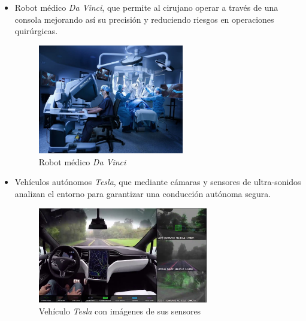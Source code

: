 \begin{itemize}
    \item Robot médico \textit{Da Vinci}, que permite al cirujano operar a través de una consola mejorando así su precisión y reduciendo riesgos en operaciones quirúrgicas.
      \begin{figure}[H]
    \centering
    \includegraphics[width=0.6\textwidth]{img/davinci.jpg}
    \caption{Robot médico \textit{Da Vinci}} \label{fig:davinci}
    \end{figure}
    \item Vehículos autónomos \textit{Tesla}, que mediante cámaras y sensores de ultra-sonidos analizan el entorno para garantizar una conducción autónoma segura.




    \begin{figure}[H]
        \centering
        \includegraphics[width=0.7\textwidth]{img/tesla.jpg}
        \caption{Vehículo \textit{Tesla} con imágenes de sus sensores} \label{fig:tesla}
    \end{figure}


\end{itemize}
